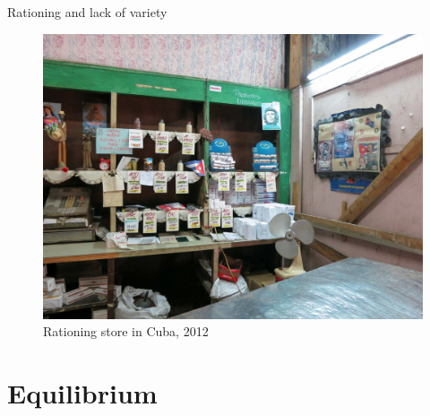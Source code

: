\documentclass[notes,11pt, aspectratio=169, xcolor=table]{beamer}
\begin{document}
\begin{frame}{Rationing and lack of variety}
\begin{figure}
    \centering
    \includegraphics[width=0.6\linewidth]{figs/Libreta-Store.jpg}
    \caption{Rationing store in Cuba, 2012}
\end{figure}
\end{frame}

\section{Equilibrium}
\end{document}
